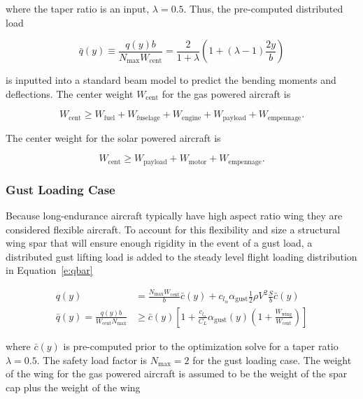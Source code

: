 \documentclass[]{aiaa-tc}%
\begin{document}
where the taper ratio is an input, $\lambda=0.5$.  Thus, the pre-computed distributed load 

\begin{equation}
    \label{e:qbar}
    \bar{q}(y) \equiv \frac{q(y)b}{N_{\text{max}}W_{\text{cent}}} = \frac{2}{1+\lambda} \left( 1 + (\lambda - 1) \frac{2y}{b} \right)
\end{equation}

is inputted into a standard beam model to predict the bending moments and deflections. The center weight $W_{\text{cent}}$ for the gas powered aircraft is

\begin{equation}
    W_{\text{cent}} \geq W_{\text{fuel}} + W_{\text{fuselage}} + W_{\text{engine}} + W_{\text{payload}} + W_{\text{empennage}}.
\end{equation}

The center weight for the solar powered aircraft is

\begin{equation}
    W_{\text{cent}} \geq W_{\text{payload}} + W_{\text{motor}} + W_{\text{empennage}}.
\end{equation}


\subsubsection{Gust Loading Case}

Because long-endurance aircraft typically have high aspect ratio wing they are considered flexible aircraft. 
To account for this flexibility and size a structural wing spar that will ensure enough rigidity in the event of a gust load, a distributed gust lifting load is added to the steady level flight loading distribution in Equation~\eqref{e:qbar}

\begin{align}
    q(y) &= \frac{N_{\text{max}}W_{\text{cent}}}{b}\bar{c}(y) + c_{l_{\alpha}} \alpha_{\text{gust}} \frac{1}{2} \rho V^2 \frac{S}{b}\bar{c}(y) \\
    \bar{q}(y) = \frac{q(y)b}{W_{\text{cent}}N_{\text{max}}} &\geq \bar{c}(y) \left[1 + \frac{c_{l_{\alpha}}}{C_L} \alpha_{\text{gust}} (y) \left(1 + \frac{W_{\text{wing}}}{W_{\text{cent}}} \right) \right]
\end{align}

where $\bar{c}(y)$ is pre-computed prior to the optimization solve for a taper ratio $\lambda = 0.5$. The safety load factor is $N_{\text{max}}=2$ for the gust loading case. The weight of the wing for the gas powered aircraft is assumed to be the weight of the spar cap plus the weight of the wing
\end{document}
